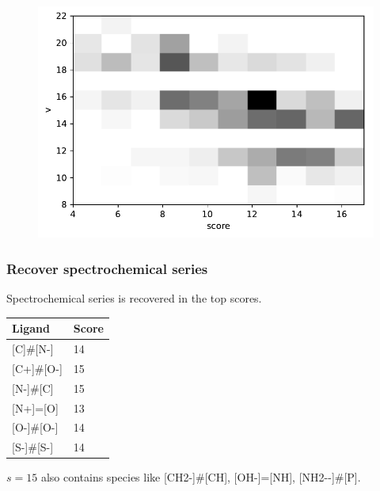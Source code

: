 \documentclass[xcolor=dvipsnames]{beamer}
\begin{document}
\begin{frame}
\begin{figure}[ht]
\begin{minipage}[b]{0.5\linewidth}
		\vspace{2ex}
	\end{minipage}%
	\begin{minipage}[b]{0.5\linewidth}
		\centering
		\includegraphics[width=.8\linewidth]{img/dhal_ss_score_vs_v_2d_hist.pdf} 
		\vspace{2ex}
	\end{minipage} 
\end{figure}
\end{frame}



\begin{frame}
\frametitle{Recover spectrochemical series}
Spectrochemical series is recovered in the top scores.

\begin{table}[]
	\centering
	\begin{tabular}{ll}
		\toprule
		Ligand	            & Score		  \\
		\midrule
		{[C]}\#{[N-]}       & 14          \\[0.1cm]
		{[C+]}\#{[O-]}       & 15          \\[0.1cm]
		{[N-]}\#{[C]}       & 15          \\[0.1cm]
		{[N+]}={[O]}        & 13          \\[0.1cm]
		{[O-]}\#{[O-]}       & 14          \\[0.1cm]
		{[S-]}\#{[S-]}       & 14          \\[0.1cm]
		\bottomrule
	\end{tabular}
	\end{table}
	
	$s = 15$ also contains species like [CH2-]\#[CH], [OH-]=[NH], [NH2-{}-]\#[P].
\end{frame}
\end{document}
